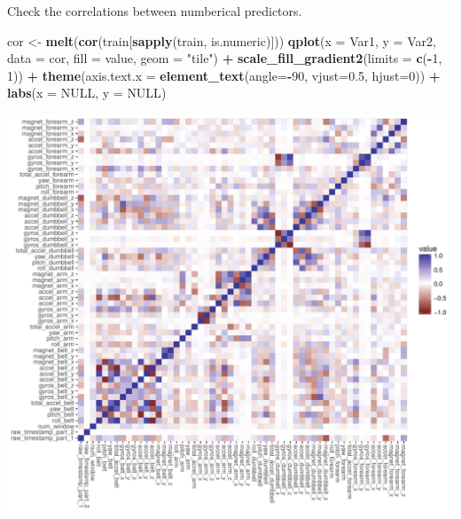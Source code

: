 \documentclass[]{article}
\newenvironment{Shaded}{\begin{snugshade}}{\end{snugshade}}
\newcommand{\KeywordTok}[1]{\textcolor[rgb]{0.13,0.29,0.53}{\textbf{#1}}}
\newcommand{\DataTypeTok}[1]{\textcolor[rgb]{0.13,0.29,0.53}{#1}}
\newcommand{\DecValTok}[1]{\textcolor[rgb]{0.00,0.00,0.81}{#1}}
\newcommand{\FloatTok}[1]{\textcolor[rgb]{0.00,0.00,0.81}{#1}}
\newcommand{\StringTok}[1]{\textcolor[rgb]{0.31,0.60,0.02}{#1}}
\newcommand{\OtherTok}[1]{\textcolor[rgb]{0.56,0.35,0.01}{#1}}
\newcommand{\OperatorTok}[1]{\textcolor[rgb]{0.81,0.36,0.00}{\textbf{#1}}}
\newcommand{\NormalTok}[1]{#1}
\begin{document}
Check the correlations between numberical predictors.

\begin{Shaded}
\begin{Highlighting}[]
\NormalTok{cor <-}\StringTok{ }\KeywordTok{melt}\NormalTok{(}\KeywordTok{cor}\NormalTok{(train[}\KeywordTok{sapply}\NormalTok{(train, is.numeric)]))}
\KeywordTok{qplot}\NormalTok{(}\DataTypeTok{x =}\NormalTok{ Var1, }\DataTypeTok{y =}\NormalTok{ Var2, }\DataTypeTok{data =}\NormalTok{ cor, }\DataTypeTok{fill =}\NormalTok{ value, }\DataTypeTok{geom =} \StringTok{"tile"}\NormalTok{) }\OperatorTok{+}
\StringTok{        }\KeywordTok{scale_fill_gradient2}\NormalTok{(}\DataTypeTok{limits =} \KeywordTok{c}\NormalTok{(}\OperatorTok{-}\DecValTok{1}\NormalTok{, }\DecValTok{1}\NormalTok{)) }\OperatorTok{+}
\StringTok{        }\KeywordTok{theme}\NormalTok{(}\DataTypeTok{axis.text.x =} \KeywordTok{element_text}\NormalTok{(}\DataTypeTok{angle=}\OperatorTok{-}\DecValTok{90}\NormalTok{, }\DataTypeTok{vjust=}\FloatTok{0.5}\NormalTok{, }\DataTypeTok{hjust=}\DecValTok{0}\NormalTok{)) }\OperatorTok{+}\StringTok{ }
\StringTok{        }\KeywordTok{labs}\NormalTok{(}\DataTypeTok{x =} \OtherTok{NULL}\NormalTok{, }\DataTypeTok{y =} \OtherTok{NULL}\NormalTok{)}
\end{Highlighting}
\end{Shaded}

\includegraphics{Project_files/figure-latex/unnamed-chunk-6-1.pdf}
\end{document}
